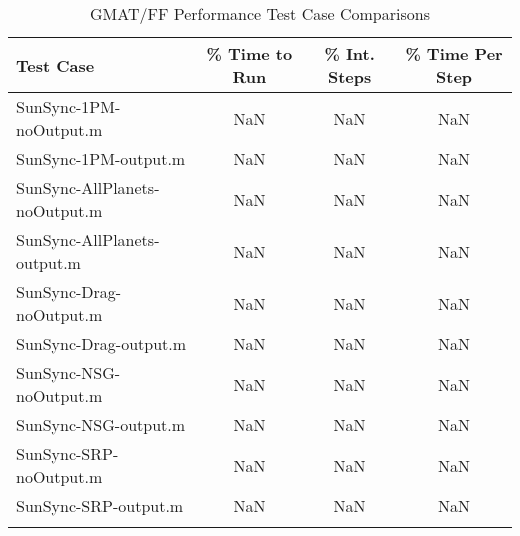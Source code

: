 \begin{table}[htbp!]
\centering
\caption{ GMAT/FF Performance Test Case Comparisons}
      \begin{tabular}{lccc}
      \hline\hline
          Test Case & \% Time to Run & \% Int. Steps & \% Time Per Step \\
         \hline
         SunSync-1PM-noOutput.m & NaN & NaN & NaN \\
         SunSync-1PM-output.m & NaN & NaN & NaN \\
         SunSync-AllPlanets-noOutput.m & NaN & NaN & NaN \\
         SunSync-AllPlanets-output.m & NaN & NaN & NaN \\
         SunSync-Drag-noOutput.m & NaN & NaN & NaN \\
         SunSync-Drag-output.m & NaN & NaN & NaN \\
         SunSync-NSG-noOutput.m & NaN & NaN & NaN \\
         SunSync-NSG-output.m & NaN & NaN & NaN \\
         SunSync-SRP-noOutput.m & NaN & NaN & NaN \\
         SunSync-SRP-output.m & NaN & NaN & NaN \\
      \hline\hline
      \label{Table: Performance4-3} 
\end{tabular}
\end{table}
